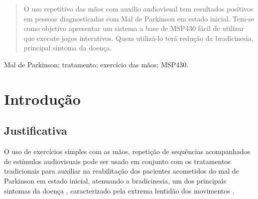 \documentclass[conference]{IEEEtran}
\begin{document}
\maketitle


\begin{abstract}
O uso repetitivo das mãos com auxílio audiovisual tem resultados positivos em pessoas diagnosticadas com Mal de Parkinson em estado inicial. Tem-se como objetivo apresentar um sistema a base de MSP430 fácil de utilizar que execute jogos interativos. Quem utilizá-lo terá redução da bradicinesia, principal sintoma da doença. 
\end{abstract}
\begin{IEEEkeywords}
	Mal de Parkinson; tratamento; exercício das mãos;  MSP430.
\end{IEEEkeywords}






%
\IEEEpeerreviewmaketitle



\section{Introdução}



\subsection{Justificativa}
O uso de exercícios simples com as mãos, repetição de sequências acompanhados de estímulos audiovisuais pode ser usado em conjunto com os tratamentos tradicionais para auxiliar na reabilitação dos pacientes acometidos do mal de Parkinson em estado inicial, atenuando a bradicinesia, um dos principais sintomas da doença \cite{medtronic}, caracterizado pela extrema lentidão dos movimentos \cite{pelosin}.
\end{document}
